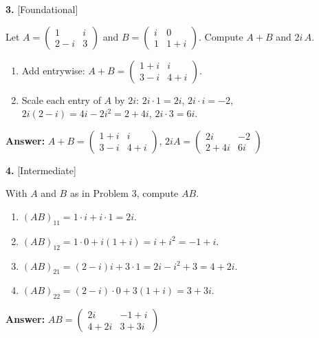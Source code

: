\documentclass[11pt]{article}
\begin{document}
\par\vspace{2pt}
\begin{minipage}{\linewidth}\textbf{3.} \hfill{\scriptsize\color{ink}[Foundational]}\par\nopagebreak Let $A=\begin{pmatrix}1&i\\2-i&3\end{pmatrix}$ and $B=\begin{pmatrix}i&0\\1&1+i\end{pmatrix}$. Compute $A+B$ and $2i\,A$.
\end{minipage}\par\nopagebreak
\begin{tcolorbox}[breakable,colback=ans,colframe=ansb,boxrule=0.5pt,left=4pt,right=4pt,top=2pt,bottom=2pt]\begin{enumerate}[leftmargin=2.2em,itemsep=1pt,topsep=1pt,label=\textbf{Step \arabic*.}]\item Add entrywise: $A+B=\begin{pmatrix}1+i&i\\3-i&4+i\end{pmatrix}$.
\item Scale each entry of $A$ by $2i$: $2i\cdot1=2i$, $2i\cdot i=-2$, $2i(2-i)=4i-2i^{2}=2+4i$, $2i\cdot3=6i$.
\end{enumerate}\textbf{Answer:} $A+B=\begin{pmatrix}1+i&i\\3-i&4+i\end{pmatrix}$, \quad $2iA=\begin{pmatrix}2i&-2\\2+4i&6i\end{pmatrix}$\end{tcolorbox}
\par\vspace{2pt}
\begin{minipage}{\linewidth}\textbf{4.} \hfill{\scriptsize\color{ink}[Intermediate]}\par\nopagebreak With $A$ and $B$ as in Problem 3, compute $AB$.
\end{minipage}\par\nopagebreak
\begin{tcolorbox}[breakable,colback=ans,colframe=ansb,boxrule=0.5pt,left=4pt,right=4pt,top=2pt,bottom=2pt]\begin{enumerate}[leftmargin=2.2em,itemsep=1pt,topsep=1pt,label=\textbf{Step \arabic*.}]\item $(AB)_{11}=1\cdot i+i\cdot1=2i$.
\item $(AB)_{12}=1\cdot0+i(1+i)=i+i^{2}=-1+i$.
\item $(AB)_{21}=(2-i)i+3\cdot1=2i-i^{2}+3=4+2i$.
\item $(AB)_{22}=(2-i)\cdot0+3(1+i)=3+3i$.
\end{enumerate}\textbf{Answer:} $AB=\begin{pmatrix}2i&-1+i\\4+2i&3+3i\end{pmatrix}$\end{tcolorbox}
\end{document}
